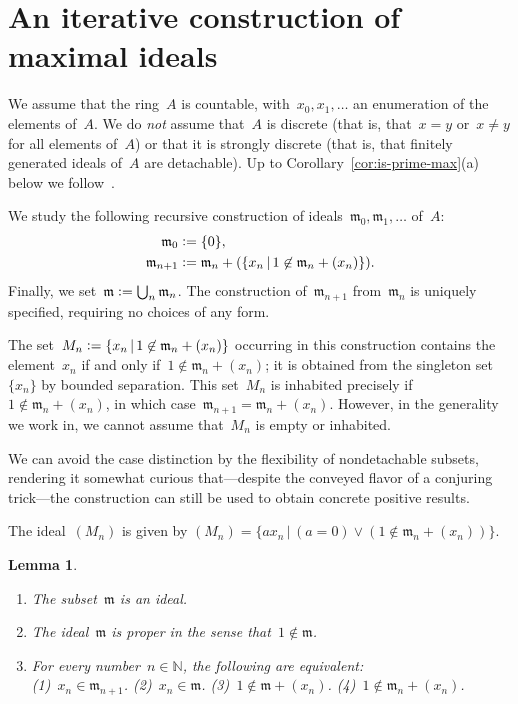 \documentclass[com,11pt,crcready]{iosart2x}
\theoremstyle{definition}
\theoremstyle{plain}
\newtheorem{lemma}[definition]{Lemma}
\theoremstyle{remark}
\newcommand{\?}{\,{:}\,}
\newcommand{\mmm}{\mathfrak{m}}
\newcommand{\NN}{\mathbb{N}}
\newcommand{\defeq}{\vcentcolon=}
\renewcommand{\_}{\mathpunct{.}\,}
\begin{document}
\section{An iterative construction of maximal ideals}
\label{sect:constr}

We assume that the ring~$A$ is countable, with~$x_0, x_1, \ldots$ an
enumeration of the elements of~$A$. We do \emph{not} assume that~$A$ is
discrete (that is, that~$x = y$ or~$x \neq y$ for all elements of~$A$) or that
it is strongly discrete (that is, that finitely generated
ideals of~$A$ are detachable). Up to Corollary~\ref{cor:is-prime-max}(a) below
we follow~\cite{berardi-valentini:krivine}.

We study the following recursive construction of ideals~$\mmm_0, \mmm_1,
\ldots$ of~$A$:
\begin{align*}
  \mmm_0 &\defeq \{0\}, \\
  \mmm_{n+1} &\defeq \mmm_n + (\{ x_n \,|\, 1 \not\in \mmm_n + (x_n) \}).
\end{align*}
Finally, we set~$\mmm \defeq \bigcup_n \mmm_n$. The construction
of~$\mmm_{n+1}$ from~$\mmm_n$ is uniquely specified, requiring no choices of
any form.

The set~$M_n \defeq \{ x_n \,|\, 1 \not\in \mmm_n + (x_n) \}$ occurring in this
construction contains the element~$x_n$ if and only if~$1 \not\in \mmm_n +
(x_n)$; it is obtained from the singleton set~$\{x_n\}$ by bounded separation.
This set~$M_n$ is inhabited precisely if~$1 \not\in \mmm_n + (x_n)$, in which case~$\mmm_{n+1} = \mmm_n + (x_n)$.
However, in the generality we work in, we cannot assume that~$M_n$ is empty or
inhabited.

We can avoid the case distinction by the flexibility of nondetachable
subsets, rendering it somewhat curious that---despite the conveyed flavor of a
conjuring trick---the construction can still be used to obtain concrete
positive results.

The ideal~$(M_n)$ is given by
$(M_n) = \{ a x_n \,|\, (a = 0) \vee (1 \not\in \mmm_n + (x_n)) \}$.

\begin{lemma}\label{lemma:omnibus}
\begin{enumerate}
\item[\textnormal{(a)}] The subset~$\mmm$ is an ideal.
\item[\textnormal{(b)}] The ideal~$\mmm$ is \emph{proper} in the sense that~$1 \not\in \mmm$.
\item[\textnormal{(c)}] For every number~$n \in \NN$, the following are equivalent: \\
(1)~$x_n \in \mmm_{n+1}$.\quad
(2)~$x_n \in \mmm$.\quad
(3)~$1 \not\in \mmm + (x_n)$.\quad
(4)~$1 \not\in \mmm_n + (x_n)$.
\end{enumerate}
\end{lemma}
\end{document}
